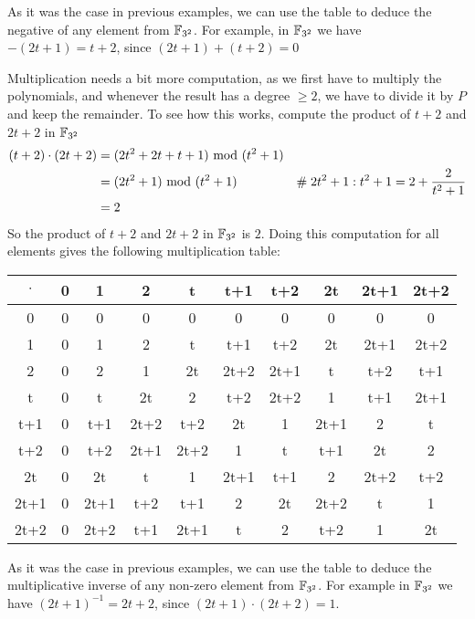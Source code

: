 \begin{example}
As it was the case in previous examples, we can use the table to deduce the negative of any element from $\mathbb{F}_{3^2}$. For example, in $\mathbb{F}_{3^2}$ we have $-(2t+1)= t+2$, since $(2t+1) + (t+2)=0$

Multiplication needs a bit more computation, as we first have to multiply the polynomials, and whenever the result has a degree $\geq 2$, we have to divide it by $P$ and keep the remainder. To see how this works, compute the product of $t+2$ and $2t+2$ in $\mathbb{F}_{3^2}$
\begin{align*}
(t+2) \cdot (2t+2) &= (2t^2 + 2t + t + 1) \text{ mod } (t^2+1) \\
                   &= (2t^2+1) \text{ mod } (t^2+1) & \#\; 2t^2+1:t^2+1= 2 + \frac{2}{t^2+1} \\
                   &= 2
\end{align*}
So the product of $t+2$ and $2t+2$ in $\mathbb{F}_{3^2}$ is $2$. Doing this computation for all elements gives the following multiplication table:
\begin{center}
  \begin{tabular}{c | c c c c c c c c c}
$\cdot$ & 0    & 1    & 2    & t    & t+1  & t+2  & 2t   & 2t+1 & 2t+2 \\\hline
      0 & 0    & 0    & 0    & 0    & 0    & 0    & 0    & 0    & 0 \\
      1 & 0    & 1    & 2    & t    & t+1  & t+2  & 2t   & 2t+1 & 2t+2\\
      2 & 0    & 2    & 1    & 2t   & 2t+2 & 2t+1 & t    & t+2  & t+1 \\
      t & 0    & t    & 2t   & 2    & t+2  & 2t+2 & 1    & t+1  & 2t+1  \\
    t+1 & 0    & t+1  & 2t+2 & t+2  & 2t   & 1    & 2t+1 & 2    & t   \\
    t+2 & 0    & t+2  & 2t+1 & 2t+2 & 1    & t    & t+1  & 2t   & 2    \\
     2t & 0    & 2t   & t    & 1    & 2t+1 & t+1  & 2  & 2t+2 & t+2\\
   2t+1 & 0    & 2t+1 & t+2  & t+1  & 2    & 2t   & 2t+2 & t    & 1    \\
   2t+2 & 0    & 2t+2 & t+1  & 2t+1 & t    & 2    & t+2  & 1     & 2t
  \end{tabular}
\end{center}
As it was the case in previous examples, we can use the table to deduce the multiplicative inverse of any non-zero element from $\mathbb{F}_{3^2}$. For example in $\mathbb{F}_{3^2}$ we have $(2t+1)^{-1}= 2t+2 $, since $(2t+1) \cdot (2t+2)=1$.


\end{example}
